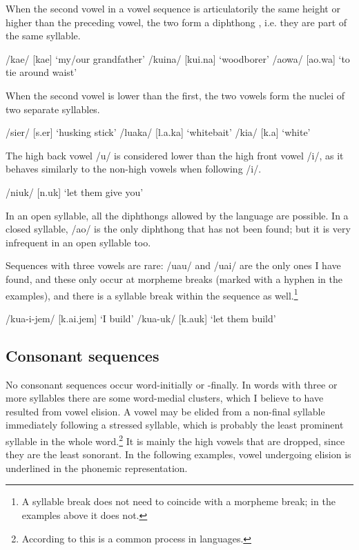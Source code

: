When the second vowel in a vowel sequence is articulatorily the same height or higher than the preceding vowel, the two form a diphthong , i.e. they are part of the same syllable.

\ea
\ea
/kae/  [{{\textprimstress}kae}]  `my/our grandfather'
\ex
/kuina/  [{{\textprimstress}kui.na}]  `woodborer'
\ex
/aowa/  [{{\textprimstress}ao.wa}]  `to tie around waist'
\z
\z


When the second vowel is lower than the first, the two vowels form the nuclei of two separate syllables. 

\ea
\ea
/sier/  [s{\textsci}.{{\textprimstress}er}]  `husking stick'
\ex
/luaka/  [l{\textupsilon}.{{\textprimstress}a.ka}]  `whitebait'
\ex
/kia/  [k{\textsci}.{{\textprimstress}a}]  `white'
\z
\z


The high back vowel /u/ is considered lower than the high front vowel /i/, as it behaves similarly to the non-high vowels when following /i/.

\ea
/niuk/  [n{\textsci}.{{\textprimstress}uk}]  `let them give you'
\z

In an open syllable, all the diphthongs allowed by the language are possible. In a closed syllable, /ao/ is the only diphthong that has not been found; but it is very infrequent in an open syllable too. 

Sequences with three vowels are rare: /uau/ and /uai/ are the only ones I have found, and these only occur at morpheme breaks (marked with a hyphen in the examples), and there is a syllable break within the sequence as well.\footnote{A syllable break does not need to coincide with a morpheme break; in the examples above it does not.}  

\ea
\ea
/kua-i-jem/    [k{\textupsilon}.{{\textprimstress}}ai.jem]      `I build'
\ex
/kua-uk/      [k{\textupsilon}.{{\textprimstress}a}uk]      `let them build'
\z
\z

\subsection{Consonant sequences} \label{sec:2.2.3}

No consonant sequences occur word-initially or -finally. In words with three or more syllables there are some word-medial clusters, which I believe to have resulted from vowel elision.  A vowel may be elided from a non-final syllable immediately following a stressed syllable, which is probably the least prominent syllable in the whole word.\footnote{According to \citet[11]{Sommerstein1977} this is a common process in languages.} It is mainly the high vowels that are dropped, since they are the least sonorant. In the following examples, vowel undergoing elision is underlined in the phonemic representation.

